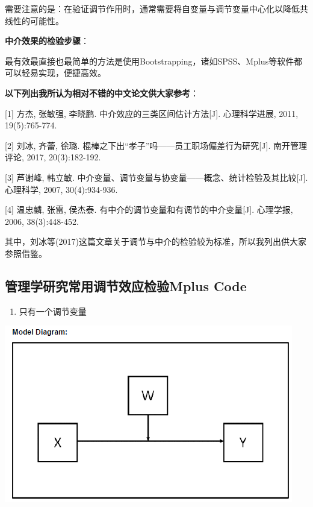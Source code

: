 \documentclass[
]{book}
\providecommand{\tightlist}{%
  \setlength{\itemsep}{0pt}\setlength{\parskip}{0pt}}
\begin{document}
需要注意的是：在验证调节作用时，通常需要将自变量与调节变量中心化以降低共线性的可能性。

\textbf{中介效果的检验步骤}：

最有效最直接也最简单的方法是使用Bootstrapping，诸如SPSS、Mplus等软件都可以轻易实现，便捷高效。

\textbf{以下列出我所认为相对不错的中文论文供大家参考}：

{[}1{]} 方杰, 张敏强, 李晓鹏. 中介效应的三类区间估计方法{[}J{]}. 心理科学进展, 2011, 19(5):765-774.

{[}2{]} 刘冰, 齐蕾, 徐璐. 棍棒之下出``孝子''吗------员工职场偏差行为研究{[}J{]}. 南开管理评论, 2017, 20(3):182-192.

{[}3{]} 芦谢峰, 韩立敏. 中介变量、调节变量与协变量------概念、统计检验及其比较{[}J{]}. 心理科学, 2007, 30(4):934-936.

{[}4{]} 温忠麟, 张雷, 侯杰泰. 有中介的调节变量和有调节的中介变量{[}J{]}. 心理学报, 2006, 38(3):448-452.

其中，刘冰等(2017)这篇文章关于调节与中介的检验较为标准，所以我列出供大家参照借鉴。

\hypertarget{mocode}{%
\subsection{管理学研究常用调节效应检验Mplus Code}\label{mocode}}

\begin{enumerate}
\def\labelenumi{\arabic{enumi}.}
\tightlist
\item
  只有一个调节变量
\end{enumerate}

\includegraphics{figs/1111.png}
\end{document}
